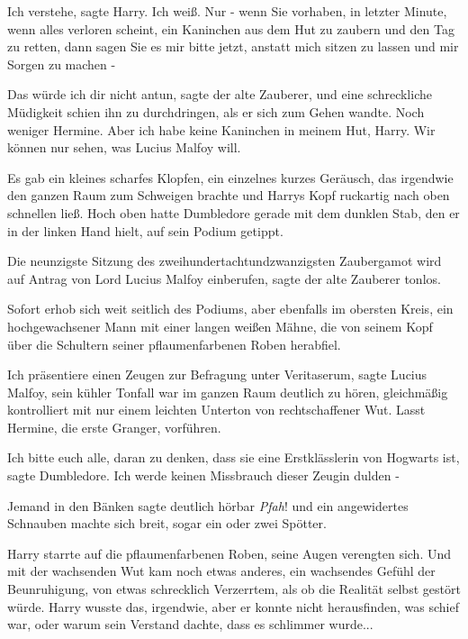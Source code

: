 \glqq Ich verstehe\grqq{}, sagte Harry. \glqq Ich weiß. Nur - wenn Sie vorhaben,
in letzter Minute, wenn alles verloren scheint, ein Kaninchen aus dem Hut zu
zaubern und den Tag zu retten, dann sagen Sie es mir bitte jetzt, anstatt mich
sitzen zu lassen und mir Sorgen zu machen -\grqq{}

\glqq Das würde ich dir nicht antun\grqq{}, sagte der alte Zauberer, und eine
schreckliche Müdigkeit schien ihn zu durchdringen, als er sich zum Gehen wandte.
\glqq Noch weniger Hermine. Aber ich habe keine Kaninchen in meinem Hut, Harry.
Wir können nur sehen, was Lucius Malfoy will.\grqq{}

Es gab ein kleines scharfes Klopfen, ein einzelnes kurzes Geräusch, das
irgendwie den ganzen Raum zum Schweigen brachte und Harrys Kopf ruckartig nach
oben schnellen ließ. Hoch oben hatte Dumbledore gerade mit dem dunklen Stab, den
er in der linken Hand hielt, auf sein Podium getippt.

\glqq Die neunzigste Sitzung des zweihundertachtundzwanzigsten Zaubergamot wird
auf Antrag von Lord Lucius Malfoy einberufen\grqq{}, sagte der alte Zauberer
tonlos.

Sofort erhob sich weit seitlich des Podiums, aber ebenfalls im obersten Kreis,
ein hochgewachsener Mann mit einer langen weißen Mähne, die von seinem Kopf über
die Schultern seiner pflaumenfarbenen Roben herabfiel.

\glqq Ich präsentiere einen Zeugen zur Befragung unter Veritaserum\grqq{}, sagte
Lucius Malfoy, sein kühler Tonfall war im ganzen Raum deutlich zu hören,
gleichmäßig kontrolliert mit nur einem leichten Unterton von rechtschaffener
Wut. \glqq Lasst Hermine, die erste Granger, vorführen.\grqq{}

\glqq Ich bitte euch alle, daran zu denken, dass sie eine Erstklässlerin von
Hogwarts ist\grqq{}, sagte Dumbledore. \glqq Ich werde keinen Missbrauch dieser
Zeugin dulden -\grqq{}

Jemand in den Bänken sagte deutlich hörbar \glqq \emph{Pfah}!\grqq{} und ein
angewidertes Schnauben machte sich breit, sogar ein oder zwei Spötter.

Harry starrte auf die pflaumenfarbenen Roben, seine Augen verengten sich. Und
mit der wachsenden Wut kam noch etwas anderes, ein wachsendes Gefühl der
Beunruhigung, von etwas schrecklich Verzerrtem, als ob die Realität selbst
gestört würde. Harry wusste das, irgendwie, aber er konnte nicht herausfinden,
was schief war, oder warum sein Verstand dachte, dass es schlimmer wurde...

